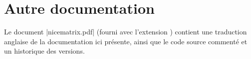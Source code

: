\documentclass[dvipsnames]{article}%
\begin{document}

\section*{Autre documentation}

Le document |nicematrix.pdf| (fourni avec l'extension ) contient
une traduction anglaise de la documentation ici présente, ainsi que le code
source commenté et un historique des versions.
\end{document}
